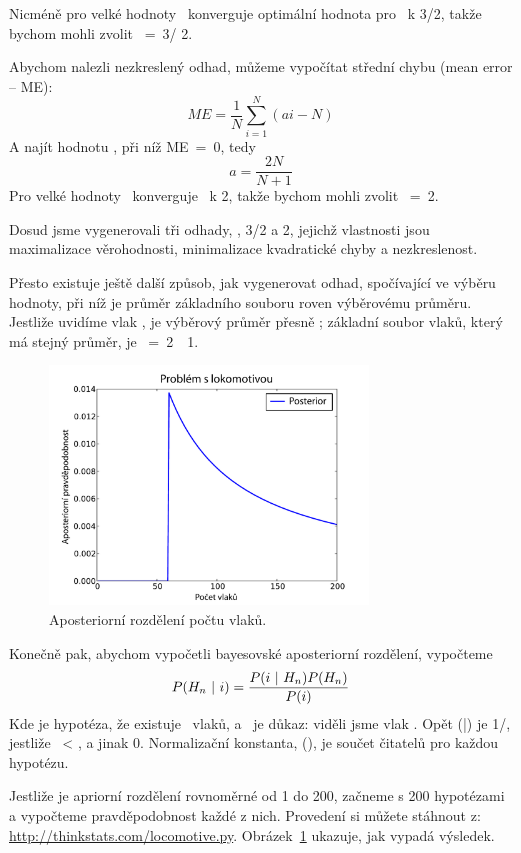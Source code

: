 \documentclass[12pt]{book}
\begin{document}
Nicméně pro velké hodnoty \N~konverguje optimální hodnota pro \mya~k 3/2, takže bychom mohli zvolit \mynhat~=~3\ii / 2.

Abychom nalezli nezkreslený odhad, můžeme vypočítat střední chybu (mean error -- ME):
%
\[ ME = \frac{1}{N} \sum_{i=1}^N (ai - N) \]
%
A najít hodnotu \mya, při níž ME~=~0, tedy
%
\[ a = \frac{2N}{N+1}\]
%
Pro velké hodnoty \N~konverguje \mya~k 2, takže bychom mohli zvolit
\mynhat~=~2\ii.

Dosud jsme vygenerovali tři odhady, \ii, 3\ii/2 a 2\ii,
jejichž vlastnosti jsou maximalizace věrohodnosti, minimalizace kvadratické chyby a nezkreslenost.

Přesto existuje ještě další způsob, jak vygenerovat odhad, spočívající ve výběru hodnoty, při níž je průměr základního souboru roven výběrovému průměru. Jestliže uvidíme vlak \ii, je výběrový průměr přesně \ii; základní soubor vlaků, který má stejný průměr, je \mynhat~=~2\ii~\minus~1.

\begin{figure}
\centerline{\includegraphics[height=2.5in]{figs/locomotive.pdf}}
\caption{Aposteriorní rozdělení počtu vlaků.}
\label{locomotive}
\end{figure}

Konečně pak, abychom vypočetli bayesovské aposteriorní rozdělení, vypočteme
%
\[ P(H_n ~|~ i) = \frac{P(i ~|~ H_n) P(H_n)}{P(i)} \]
%
Kde \HH{} je hypotéza, že existuje \n~vlaků, a \ii~je důkaz:
viděli jsme vlak \ii.  Opět \Prob(\ii|\HH{})
je 1/\n, jestliže \ii~< \n, a jinak 0.  Normalizační konstanta,
\Prob(\ii), je součet čitatelů pro každou hypotézu.

Jestliže je apriorní rozdělení rovnoměrné od 1 do 200, začneme s 200
hypotézami a vypočteme pravděpodobnost každé z nich. Provedení si můžete stáhnout z:
\url{http://thinkstats.com/locomotive.py}.  Obrázek~\ref{locomotive} ukazuje, jak vypadá výsledek.
\end{document}
